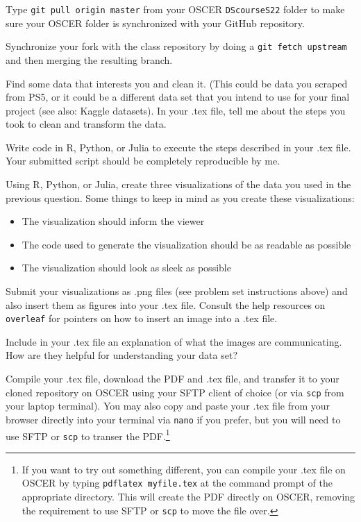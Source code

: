 \documentclass[12pt,english]{exam}
\begin{document}
\begin{questions}
\question Type \texttt{git pull origin master} from your OSCER \texttt{DScourseS22} folder to make sure your OSCER folder is synchronized with your GitHub repository. 

\question Synchronize your fork with the class repository by doing a \texttt{git fetch upstream} and then merging the resulting branch. 

\question Find some data that interests you and clean it. (This could be data you scraped from PS5, or it could be a different data set that you intend to use for your final project (see also: Kaggle datasets). In your .tex file, tell me about the steps you took to clean and transform the data.

Write code in R, Python, or Julia to execute the steps described in your .tex file. Your submitted script should be completely reproducible by me.

\question Using R, Python, or Julia, create three visualizations of the data you used in the previous question. Some things to keep in mind as you create these visualizations:
\begin{itemize}
    \item The visualization should inform the viewer
    \item The code used to generate the visualization should be as readable as possible
    \item The visualization should look as sleek as possible
\end{itemize}

Submit your visualizations as .png files (see problem set instructions above) and also insert them as figures into your .tex file. Consult the help resources on \texttt{overleaf} for pointers on how to insert an image into a .tex file.

\question Include in your .tex file an explanation of what the images are communicating. How are they helpful for understanding your data set?

\question Compile your .tex file, download the PDF and .tex file, and transfer it to your cloned repository on OSCER using your SFTP client of choice (or via \texttt{scp} from your laptop terminal). You may also copy and paste your .tex file from your browser directly into your terminal via \texttt{nano} if you prefer, but you will need to use SFTP or \texttt{scp} to transer the PDF.\footnote{If you want to try out something different, you can compile your .tex file on OSCER by typing \texttt{pdflatex myfile.tex} at the command prompt of the appropriate directory. This will create the PDF directly on OSCER, removing the requirement to use SFTP or \texttt{scp} to move the file over.}


\end{questions}
\end{document}
